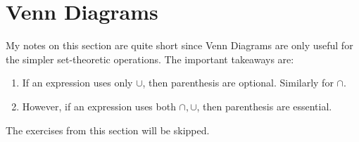 \section{Venn Diagrams}
My notes on this section are quite short since Venn Diagrams are only useful for the simpler set-theoretic operations.
The important takeaways are: 
\begin{enumerate}
    \item If an expression uses only $\cup$, then parenthesis are optional. Similarly for $\cap$.
    \item However, if an expression uses both $\cap,\cup$, then parenthesis are essential.
\end{enumerate}

The exercises from this section will be skipped. 